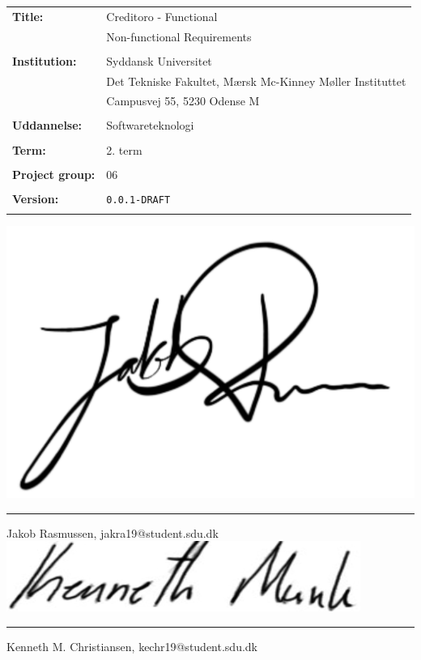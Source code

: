 \noindent
\begin{tabular}{@{}l l} 
\textbf{Title:} & Creditoro - Functional \\ 
                & Non-functional Requirements\\
& \\
\textbf{Institution:} & Syddansk Universitet \\
& Det Tekniske Fakultet, Mærsk Mc-Kinney Møller Instituttet \\
& Campusvej 55, 5230 Odense M \\
& \\
\textbf{Uddannelse:} & Softwareteknologi \\
& \\
\textbf{Term:} & 2. term \\
& \\
\textbf{Project group:} & 06\\
& \\
\textbf{Version:} & \texttt{0.0.1-DRAFT}\\
& \\
\end{tabular}

\vspace{-0.5mm}
\includegraphics[scale=0.07]{figures/signatures/signatureJR.jpg}
\vspace{-9.5mm}
\par\noindent\rule{\textwidth}{0.4pt}
\noindent
Jakob Rasmussen, jakra19@student.sdu.dk\\

\noindent
\includegraphics[scale=0.3]{figures/signatures/signature_kechr19.PNG}
\vspace{-5mm}
\par\noindent\rule{\textwidth}{0.4pt}
\noindent
Kenneth M. Christiansen, kechr19@student.sdu.dk\\
\vspace{3.5mm}

